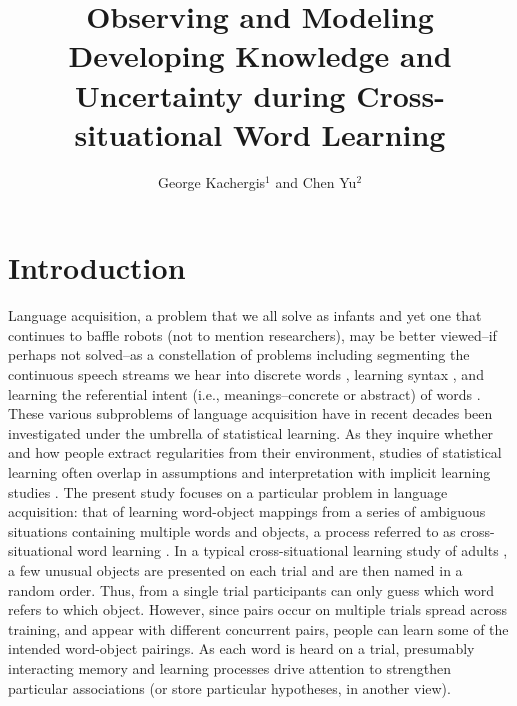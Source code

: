 \documentclass[man,floatsintext]{apa6}
\title{Observing and Modeling Developing Knowledge and Uncertainty during Cross-situational Word Learning}
\author{George Kachergis$^{1}$ and Chen Yu$^{2}$}
\affiliation{
 $^{1}$Department of Artificial Intelligence \\
  Donders Institute for Brain, Cognition, and Behavior \\
  Radboud University \\
  6525 HR Nijmegen, the Netherlands \\
  
  $^{2}$Psychological \& Brain Sciences \\
   Indiana University \\
   Bloomington, Indiana 47408 
}
\begin{document}
\maketitle

\section{Introduction}


Language acquisition, a problem that we all solve as infants and yet one that continues to baffle robots (not to mention researchers), may be better viewed--if perhaps not solved--as a constellation of problems including segmenting the continuous speech streams we hear into discrete words \cite[e.g.][]{Saffran:1996vn}, learning syntax \cite[e.g.][]{Reber:1967}, and learning the referential intent (i.e., meanings--concrete or abstract) of words \cite[e.g.,][]{Yu:2007}. These various subproblems of language acquisition have in recent decades been investigated under the umbrella of statistical learning. As they inquire whether and how people extract regularities from their environment, studies of statistical learning often overlap in assumptions and interpretation with implicit learning studies \citep{Perruchet:2006}. The present study focuses on a particular problem in language acquisition: that of learning word-object mappings from a series of ambiguous situations containing multiple words and objects, a process referred to as cross-situational word learning \citep{Gleitman:1990}. In a typical cross-situational learning study of adults \citep{Yu:2007}, a few unusual objects are presented on each trial and are then named in a random order. Thus, from a single trial participants can only guess which word refers to which object. However, since pairs occur on multiple trials spread across training, and appear with different concurrent pairs, people can learn some of the intended word-object pairings. As each word is heard on a trial, presumably interacting memory and learning processes drive attention to strengthen particular associations (or store particular hypotheses, in another view). 
\end{document}
